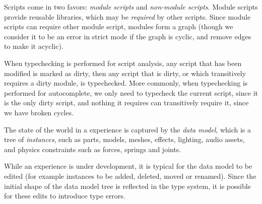 \documentclass[
  acmsmall,
  review,
]{acmart}
\begin{document}
Scripts come in two favors: \emph{module scripts} and \emph{non-module
scripts}.  Module scripts provide reusable libraries, which may be
\emph{required} by other scripts. Since module scripts can require
other module script, modules form a graph (though we consider it to be
an error in strict mode if the graph is cyclic, and remove edges to
make it acyclic).

When typechecking is performed for script analysis, any script that
has been modified is marked as dirty, then any script that is dirty,
or which transitively requires a dirty module, is typechecked. More
commonly, when typechecking is performed for autocomplete, we only
need to typecheck the current script, since it is the only dirty
script, and nothing it requires can transitively require it, since we
have broken cycles.

The state of the world in a  experience is captured by
the \emph{data model}, which is a tree of \emph{instances}, such as
parts, models, meshes, effects, lighting, audio assets, and physics
constraints such as forces, springs and joints.

While an experience is under development, it is typical for the data
model to be edited (for example instances to be added, deleted, moved
or renamed). Since the initial shape of the data model tree is reflected in
the type system, it is possible for these edits to introduce type errors.
\end{document}
